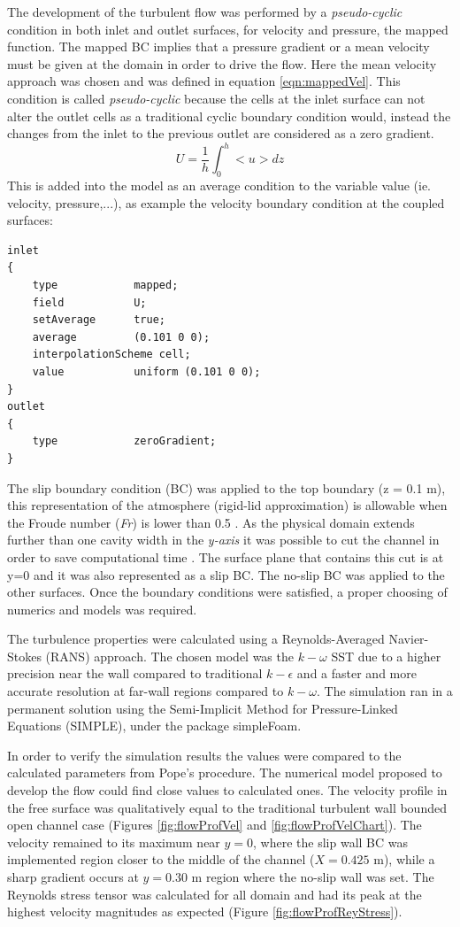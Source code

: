 \documentclass[../main.tex]{subfiles}
\begin{document}
The development of the turbulent flow was performed by a \textit{pseudo-cyclic} condition in both inlet and outlet surfaces, for velocity and pressure, the mapped function. The mapped BC implies that a pressure gradient or a mean velocity must be given at the domain in order to drive the flow. Here the mean velocity approach was chosen and was defined in equation \ref{eqn:mappedVel}. This condition is called \textit{pseudo-cyclic} because the cells at the inlet surface can not alter the outlet cells as a traditional cyclic boundary condition would, instead the changes from the inlet to the previous outlet are considered as a zero gradient. 
\begin{equation}
U=\frac{1}{h}\int_{0}^{h}<u>dz
\label{eqn:mappedVel}
\end{equation}
This is added into the model as an average condition to the variable value (ie.  velocity, pressure,...), as example the velocity boundary condition at the coupled surfaces:

\begin{lstlisting}
inlet
{
	type            mapped;
	field           U;
	setAverage      true;
	average         (0.101 0 0);
	interpolationScheme cell;
	value           uniform (0.101 0 0);
}
outlet
{
	type			zeroGradient;
}
\end{lstlisting}

The slip boundary condition (BC) was applied to the top boundary (z = 0.1 m), this representation of the atmosphere (rigid-lid approximation) is allowable when the Froude number (\textit{Fr}) is lower than 0.5 \cite{alfrink1983}. As the physical domain extends further than one cavity width in the \textit{y-axis} it was possible to cut the channel in order to save computational time \cite{Brevis2014}. The surface plane that contains this cut is at y=0 and it was also represented as a slip BC. The no-slip BC was applied to the other surfaces. Once the boundary conditions were satisfied, a proper choosing of numerics and models was required.

The turbulence properties were calculated using a Reynolds-Averaged Navier-Stokes (RANS) approach. The chosen model was the $ k-\omega$ SST due to a higher precision near the wall compared to traditional $k-\epsilon$ and a faster and more accurate resolution at far-wall regions compared to $k-\omega$. The simulation ran in a permanent solution using the Semi-Implicit Method for Pressure-Linked Equations (SIMPLE), under the package simpleFoam.

In order to verify the simulation results  the values were compared to the calculated parameters from Pope's procedure. The numerical model proposed to develop the flow could find close values to calculated ones. The velocity profile in the free surface was qualitatively equal to the traditional turbulent wall bounded open channel case (Figures \ref{fig:flowProfVel} and \ref{fig:flowProfVelChart}). The velocity remained to its maximum near $y=0$, where the slip wall BC was implemented region closer to the middle of the channel ($X=0.425$ m), while a sharp gradient occurs at $y=0.30$ m region where the no-slip wall was set. The Reynolds stress tensor was calculated for all domain and had its peak at the highest velocity magnitudes as expected (Figure \ref{fig:flowProfReyStress}).
\end{document}
